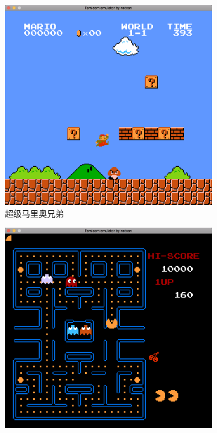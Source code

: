\documentclass[a4paper]{ltxdoc}
\begin{document}
{\begin{figure}[h]
	\centering
		\begin{subfigure}[b]{0.49\textwidth}
			\includegraphics[width=\textwidth]{images/super_mario_bros.png}
			\caption{超级马里奥兄弟}
		\end{subfigure}
		\begin{subfigure}[b]{0.49\textwidth}
			\includegraphics[width=\textwidth]{images/pac_man.png}

\end{subfigure}
\end{figure}}
\end{document}
